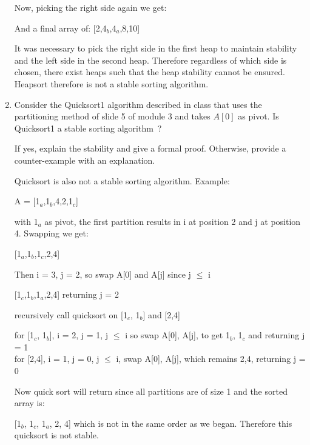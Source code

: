 \documentclass[12pt]{article}
\begin{document}
\begin{enumerate}
\begin{center}
\begin{tikzpicture}
\end{tikzpicture}\end{center}

Now, picking the right side again we get:

\begin{center}\end{center}

And a final array of: [2,4$_b$,4$_a$,8,10]

It was necessary to pick the right side in the first heap to maintain stability and the left
side in the second heap. Therefore regardless of which side is chosen, there exist heaps such that
the heap stability cannot be ensured. Heapsort therefore is not a stable sorting algorithm.


  \item Consider the Quicksort1 algorithm described in class that uses the
  partitioning method of slide 5 of module 3 and takes $A [0]$ as pivot. Is
  Quicksort1 a stable sorting algorithm~?
  
  If yes, explain the stability and give a formal proof. Otherwise, provide a
  counter-example with an explanation.

  Quicksort is also not a stable sorting algorithm. Example:

  A = [1$_a$,1$_b$,4,2,1$_c$]

  with 1$_a$ as pivot, the first partition results in i at position 2 and j at position 4. Swapping we get:

  [1$_a$,1$_b$,1$_c$,2,4]

  Then i = 3, j = 2, so swap A[0] and A[j] since j $\leq$ i

  [1$_c$,1$_b$,1$_a$,2,4] returning j = 2

  recursively call quicksort on [1$_c$, 1$_b$] and [2,4]

  for [1$_c$, 1$_b$], i = 2, j = 1, j $\leq$ i so swap A[0], A[j], to get 1$_b$, 1$_c$ and returning j = 1
  \\for [2,4], i = 1, j = 0, j $\leq$ i, swap A[0], A[j], which remains 2,4, returning j = 0

  Now quick sort will return since all partitions are of size 1 and the sorted array is:

  [1$_b$, 1$_c$, 1$_a$, 2, 4] which is not in the same order as we began. Therefore this quicksort is not stable.

\end{enumerate}
\end{document}
